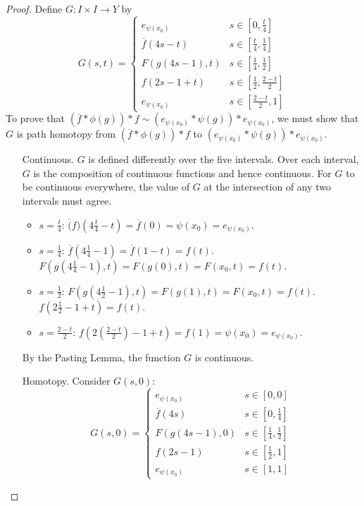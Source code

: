 \begin{proof}
	Define $G:I\times I\rightarrow Y$ by
	\[ G(s,t)= 
	\begin{cases}
		e_{\psi(x_0)} & s\in\left[0,\frac{t}{4}\right]\\
		\overline{f}(4s-t) & s\in\left[\frac{t}{4},\frac{1}{4}\right]\\
		F(g(4s-1),t) & s\in\left[\frac{1}{4},\frac{1}{2}\right]\\
		f(2s-1+t) & s\in\left[\frac{1}{2},\frac{2-t}{2}\right]\\
		e_{\psi(x_0)} &s\in\left[\frac{2-t}{2},1\right] 
	\end{cases}
	\]
	To prove that $\left(\overline{f}*\phi(g)\right)*f\sim \left( e_{\psi(x_0)}*\psi(g)\right)*e_{\psi(x_0)}$, we must show that $G$ is path homotopy from $\left(\overline{f}*\phi(g)\right)*f$ to $\left( e_{\psi(x_0)}*\psi(g)\right)*e_{\psi(x_0)}$. 
	\begin{itemize}
		\item[Continuous.] $G$ is defined differently over the five intervals. Over each interval, $G$ is the composition of continuous functions and hence continuous. For $G$ to be continuous everywhere, the value of $G$ at the intersection of any two intervals must agree. 
		\begin{itemize}
			\item $s=\frac{t}{4}$: $\overline(f)(4\frac{t}{4}-t)=\overline{f}(0)=\psi(x_0) = e_{\psi(x_0)}$. 
			\item $s=\frac{1}{4}$: $\overline{f}(4\frac{1}{4}-1)=\overline{f}(1-t)=f(t)$. \\
			$F(g(4\frac{1}{4}-1),t)= F(g(0),t)=F(x_0,t)=f(t).$ 
			\item $s=\frac{1}{2}$: $F(g(4\frac{1}{2}-1),t)= F(g(1),t)=F(x_0,t)=f(t).$\\
			$f(2\frac{1}{2}-1+t)=f(t)$. 
			\item $s=\frac{2-t}{2}$: $f(2\left(\frac{2-t}{2}\right)-1 +t) = f(1)=\psi(x_0)=e_{\psi(x_0)}$. 
		\end{itemize}
		By the Pasting Lemma, the function $G$ is continuous. 
		\item[Homotopy.] Consider $G(s,0)$:
		\[ G(s,0)= 
		\begin{cases}
			e_{\psi(x_0)} & s\in\left[0,0\right]\\
			\overline{f}(4s) &s\in\left[0,\frac{1}{4}\right]\\
			F(g(4s-1),0) &s\in\left[\frac{1}{4},\frac{1}{2}\right]\\
			f(2s-1) &s\in\left[\frac{1}{2},1\right]\\
			e_{\psi(x_0)} &s\in\left[1,1\right] 

\end{cases}\]
\end{itemize}
\end{proof}
